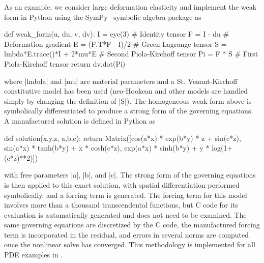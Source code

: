 As an example, we consider large deformation elasticity and implement the weak form in Python using the SymPy~\cite{sympy-web-page} symbolic algebra package as
\begin{pythoncode}
  def weak_form(u, du, v, dv):
    I = eye(3)                      # Identity tensor
    F = I - du                      # Deformation gradient
    E = (F.T*F - I)/2               # Green-Lagrange tensor
    S = lmbda*E.trace()*I + 2*mu*E  # Second Piola-Kirchoff tensor
    Pi = F * S                      # First Piola-Kirchoff tensor
    return dv.dot(Pi)
\end{pythoncode}
where \pyverb|lmbda| and \pyverb|mu| are material parameters and a St. Venant-Kirchoff constitutive model has been used (neo-Hookean and other models are handled simply by changing the definition of \pyverb|S|).
The homogeneous weak form above is symbolically differentiated to produce a strong form of the governing equations.
A manufactured solution is defined in Python as
\begin{pythoncode}
  def solution(x,y,z, a,b,c):
    return Matrix([cos(a*x) * exp(b*y) * z + sin(c*z),
                   sin(a*x) * tanh(b*y) + x * cosh(c*z),
                   exp(a*x) * sinh(b*y) + y * log(1+(c*z)**2)])
\end{pythoncode}
with free parameters \pyverb|a|, \pyverb|b|, and \pyverb|c|.
The strong form of the governing equations is then applied to this exact solution, with spatial differentiation performed symbolically, and a forcing term is generated.
The forcing term for this model involves more than a thousand transcendental functions, but C code for its evaluation is automatically generated and does not need to be examined.
The same governing equations are discretized by the C code, the manufactured forcing term is incorporated in the residual, and errors in several norms are computed once the nonlinear solve has converged.
This methodology is implemented for all PDE examples in {\Dohp}.

